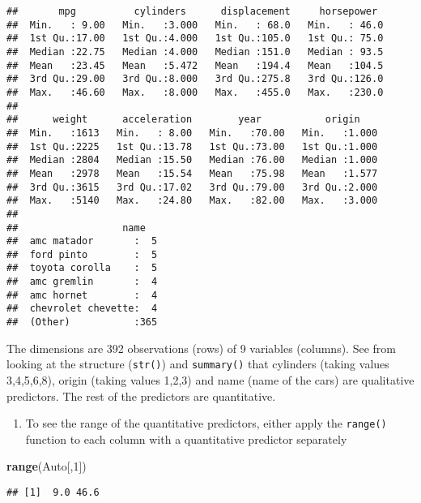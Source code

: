 \documentclass[]{article}
\newenvironment{Shaded}{\begin{snugshade}}{\end{snugshade}}
\newcommand{\DecValTok}[1]{\textcolor[rgb]{0.00,0.00,0.81}{#1}}
\newcommand{\KeywordTok}[1]{\textcolor[rgb]{0.13,0.29,0.53}{\textbf{#1}}}
\newcommand{\NormalTok}[1]{#1}
\providecommand{\tightlist}{%
  \setlength{\itemsep}{0pt}\setlength{\parskip}{0pt}}
\begin{document}
\begin{verbatim}
##       mpg          cylinders      displacement     horsepower   
##  Min.   : 9.00   Min.   :3.000   Min.   : 68.0   Min.   : 46.0  
##  1st Qu.:17.00   1st Qu.:4.000   1st Qu.:105.0   1st Qu.: 75.0  
##  Median :22.75   Median :4.000   Median :151.0   Median : 93.5  
##  Mean   :23.45   Mean   :5.472   Mean   :194.4   Mean   :104.5  
##  3rd Qu.:29.00   3rd Qu.:8.000   3rd Qu.:275.8   3rd Qu.:126.0  
##  Max.   :46.60   Max.   :8.000   Max.   :455.0   Max.   :230.0  
##                                                                 
##      weight      acceleration        year           origin     
##  Min.   :1613   Min.   : 8.00   Min.   :70.00   Min.   :1.000  
##  1st Qu.:2225   1st Qu.:13.78   1st Qu.:73.00   1st Qu.:1.000  
##  Median :2804   Median :15.50   Median :76.00   Median :1.000  
##  Mean   :2978   Mean   :15.54   Mean   :75.98   Mean   :1.577  
##  3rd Qu.:3615   3rd Qu.:17.02   3rd Qu.:79.00   3rd Qu.:2.000  
##  Max.   :5140   Max.   :24.80   Max.   :82.00   Max.   :3.000  
##                                                                
##                  name    
##  amc matador       :  5  
##  ford pinto        :  5  
##  toyota corolla    :  5  
##  amc gremlin       :  4  
##  amc hornet        :  4  
##  chevrolet chevette:  4  
##  (Other)           :365
\end{verbatim}

The dimensions are 392 observations (rows) of 9 variables (columns). See
from looking at the structure (\texttt{str()}) and \texttt{summary()}
that cylinders (taking values 3,4,5,6,8), origin (taking values 1,2,3)
and name (name of the cars) are qualitative predictors. The rest of the
predictors are quantitative.

\begin{enumerate}
\def\labelenumi{\alph{enumi})}
\setcounter{enumi}{1}
\tightlist
\item
  To see the range of the quantitative predictors, either apply the
  \texttt{range()} function to each column with a quantitative predictor
  separately
\end{enumerate}

\begin{Shaded}
\begin{Highlighting}[]
\KeywordTok{range}\NormalTok{(Auto[,}\DecValTok{1}\NormalTok{])}
\end{Highlighting}
\end{Shaded}

\begin{verbatim}
## [1]  9.0 46.6
\end{verbatim}
\end{document}
